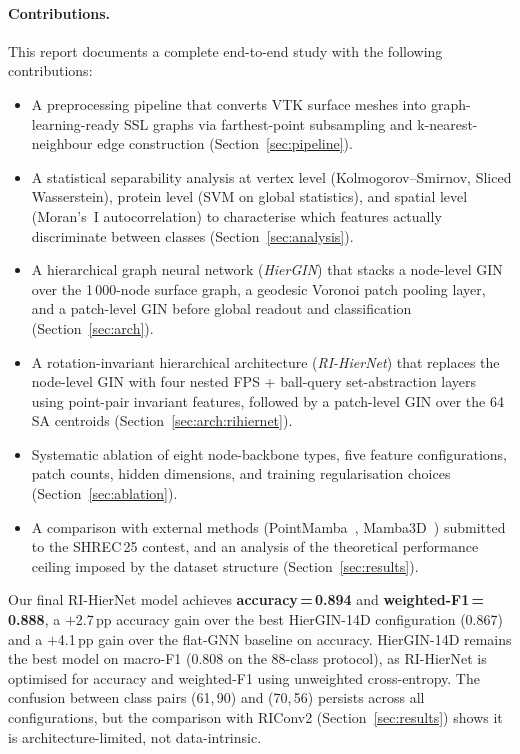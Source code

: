 \paragraph{Contributions.}
This report documents a complete end-to-end study with the following
contributions:
\begin{itemize}
  \item A preprocessing pipeline that converts VTK surface meshes into
        graph-learning-ready SSL graphs via farthest-point subsampling and
        k-nearest-neighbour edge construction
        (Section~\ref{sec:pipeline}).

  \item A statistical separability analysis at vertex level (Kolmogorov--Smirnov,
        Sliced Wasserstein), protein level (SVM on global statistics), and
        spatial level (Moran's~I autocorrelation) to characterise which
        features actually discriminate between classes
        (Section~\ref{sec:analysis}).

  \item A hierarchical graph neural network (\textit{HierGIN}) that stacks a
        node-level GIN over the 1\,000-node surface graph, a geodesic Voronoi
        patch pooling layer, and a patch-level GIN before global readout and
        classification (Section~\ref{sec:arch}).

  \item A rotation-invariant hierarchical architecture (\textit{RI-HierNet})
        that replaces the node-level GIN with four nested FPS + ball-query
        set-abstraction layers using point-pair invariant features,
        followed by a patch-level GIN over the 64 SA centroids
        (Section~\ref{sec:arch:rihiernet}).

  \item Systematic ablation of eight node-backbone types, five feature
        configurations, patch counts, hidden dimensions, and training
        regularisation choices (Section~\ref{sec:ablation}).

  \item A comparison with external methods (PointMamba~\cite{pointmamba},
        Mamba3D~\cite{mamba3d}) submitted to the SHREC\,25 contest, and an
        analysis of the theoretical performance ceiling imposed by the dataset
        structure (Section~\ref{sec:results}).
\end{itemize}

Our final RI-HierNet model achieves \textbf{accuracy\,=\,0.894} and
\textbf{weighted-F1\,=\,0.888}, a $+$2.7\,pp accuracy gain over the best
HierGIN-14D configuration (0.867) and a $+$4.1\,pp gain over the flat-GNN
baseline on accuracy.
HierGIN-14D remains the best model on macro-F1 (0.808 on the 88-class protocol),
as RI-HierNet is optimised for accuracy and weighted-F1 using unweighted
cross-entropy.
The confusion between class pairs (61,\,90) and (70,\,56) persists across all
configurations, but the comparison with RIConv2
(Section~\ref{sec:results}) shows it is architecture-limited, not data-intrinsic.

